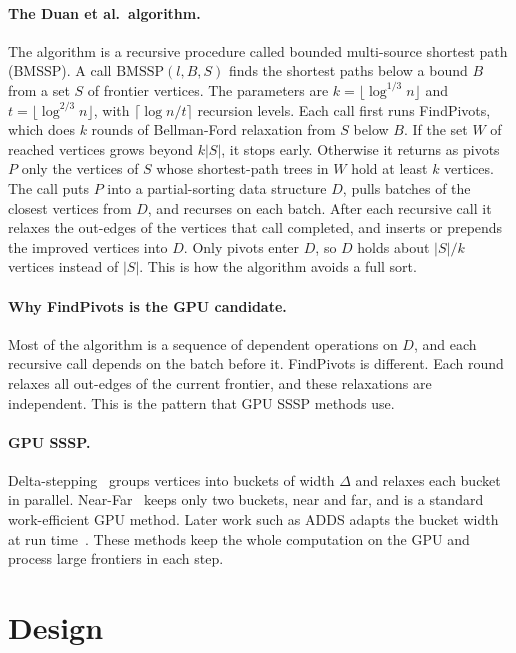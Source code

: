 \documentclass[conference]{IEEEtran}
\begin{document}
\paragraph{The Duan et al.\ algorithm.} The algorithm is a recursive procedure called bounded multi-source shortest
path (BMSSP). A call $\mathrm{BMSSP}(l, B, S)$ finds the shortest paths below a bound $B$ from a set $S$ of frontier
vertices. The parameters are $k = \lfloor \log^{1/3} n \rfloor$ and $t = \lfloor \log^{2/3} n\rfloor$, with
$\lceil \log n / t\rceil$ recursion levels. Each call first runs FindPivots, which does $k$ rounds of Bellman-Ford
relaxation from $S$ below $B$. If the set $W$ of reached vertices grows beyond $k|S|$, it stops early. Otherwise it
returns as pivots $P$ only the vertices of $S$ whose shortest-path trees in $W$ hold at least $k$ vertices. The call
puts $P$ into a partial-sorting data structure $D$, pulls batches of the closest vertices from $D$, and recurses on
each batch. After each recursive call it relaxes the out-edges of the vertices that call completed, and inserts or
prepends the improved vertices into $D$. Only pivots enter $D$, so $D$ holds about $|S|/k$ vertices instead of $|S|$.
This is how the algorithm avoids a full sort.

\paragraph{Why FindPivots is the GPU candidate.} Most of the algorithm is a sequence of dependent operations on $D$, and
each recursive call depends on the batch before it. FindPivots is different. Each round relaxes all out-edges of the
current frontier, and these relaxations are independent. This is the pattern that GPU SSSP methods use.

\paragraph{GPU SSSP.} Delta-stepping~\cite{meyer2003} groups vertices into buckets of width $\Delta$ and relaxes each
bucket in parallel. Near-Far~\cite{davidson2014} keeps only two buckets, near and far, and is a standard work-efficient
GPU method. Later work such as ADDS adapts the bucket width at run time~\cite{wang2021}. These methods keep the whole
computation on the GPU and process large frontiers in each step.

\section{Design}
\end{document}
